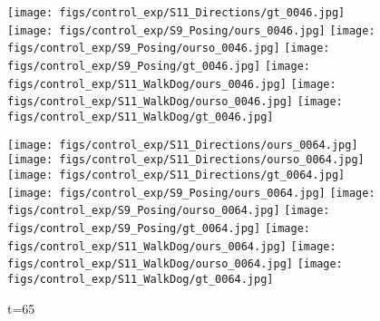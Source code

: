 \documentclass{article}
\begin{document}
\begin{appendix}
\begin{figure*}[!thbp]
\begin{subfigure}{0.12\linewidth}
  		\texttt{[image: figs/control\_exp/S11\_Directions/gt\_0046.jpg]}
  		\texttt{[image: figs/control\_exp/S9\_Posing/ours\_0046.jpg]}
  		\texttt{[image: figs/control\_exp/S9\_Posing/ourso\_0046.jpg]}
  		\vspace{.2cm}
  		\texttt{[image: figs/control\_exp/S9\_Posing/gt\_0046.jpg]}
  		\texttt{[image: figs/control\_exp/S11\_WalkDog/ours\_0046.jpg]}
  		\texttt{[image: figs/control\_exp/S11\_WalkDog/ourso\_0046.jpg]}
  		\vspace{.2cm}
  		\texttt{[image: figs/control\_exp/S11\_WalkDog/gt\_0046.jpg]}
	\end{subfigure} 
    \begin{subfigure}{0.12\linewidth}
        \caption*{t=65}
        \vspace{-7pt}
	    \texttt{[image: figs/control\_exp/S11\_Directions/ours\_0064.jpg]}
	    \texttt{[image: figs/control\_exp/S11\_Directions/ourso\_0064.jpg]}
	    \vspace{.2cm}
  		\texttt{[image: figs/control\_exp/S11\_Directions/gt\_0064.jpg]}
  		\texttt{[image: figs/control\_exp/S9\_Posing/ours\_0064.jpg]}
  		\texttt{[image: figs/control\_exp/S9\_Posing/ourso\_0064.jpg]}
  		\vspace{.2cm}
  		\texttt{[image: figs/control\_exp/S9\_Posing/gt\_0064.jpg]}
  		\texttt{[image: figs/control\_exp/S11\_WalkDog/ours\_0064.jpg]}
  		\texttt{[image: figs/control\_exp/S11\_WalkDog/ourso\_0064.jpg]}
  		\vspace{.2cm}
  		\texttt{[image: figs/control\_exp/S11\_WalkDog/gt\_0064.jpg]}

\end{subfigure}
\end{figure*}
\end{appendix}
\end{document}
